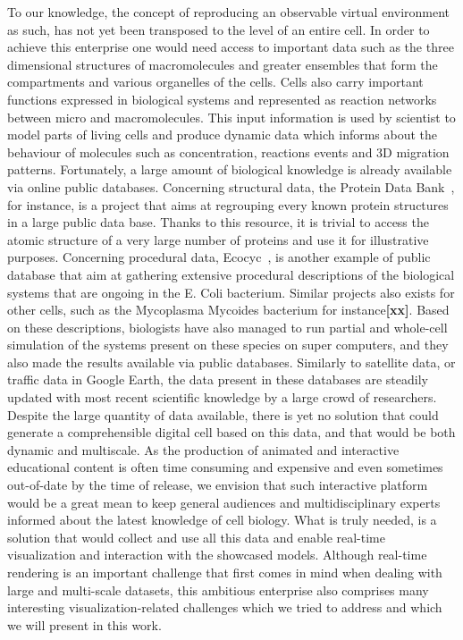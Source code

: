 To our knowledge, the concept of reproducing an observable virtual environment as such, has not yet been transposed to the level of an entire cell.
In order to achieve this enterprise one would need access to important data such as the three dimensional structures of macromolecules and greater ensembles that form the compartments and various organelles of the cells.
Cells also carry important functions expressed in biological systems and represented as reaction networks between micro and macromolecules.
This input information is used by scientist to model parts of living cells and produce dynamic data which informs about the behaviour of molecules such as concentration, reactions events and 3D migration patterns.
Fortunately, a large amount of biological knowledge is already available via online public databases.
Concerning structural data, the Protein Data Bank~\cite{bernstein1977protein}, for instance, is a project that aims at regrouping every known protein structures in a large public data base.
Thanks to this resource, it is trivial to access the atomic structure of a very large number of proteins and use it for illustrative purposes.
Concerning procedural data, Ecocyc~\cite{keseler2005ecocyc}, is another example of public database that aim at gathering extensive procedural descriptions of the biological systems that are ongoing in the E. Coli bacterium.
Similar projects also exists for other cells, such as the Mycoplasma Mycoides bacterium for instance\textbf{[xx]}.
Based on these descriptions, biologists have also managed to run partial and whole-cell simulation of the systems present on these species on super computers, and they also made the results available via public databases\cite{karr2014wholecellsimdb}.
Similarly to satellite data, or traffic data in Google Earth, the data present in these databases are steadily updated with most recent scientific knowledge by a large crowd of researchers.
Despite the large quantity of data available, there is yet no solution that could generate a comprehensible digital cell based on this data, and that would be both dynamic and multiscale.
As the production of animated and interactive educational content is often time consuming and expensive and even sometimes out-of-date by the time of release, we envision that such interactive platform would be a great mean to keep general audiences and multidisciplinary experts informed about the latest knowledge of cell biology.
What is truly needed, is a solution that would collect and use all this data and enable real-time visualization and interaction with the showcased models.
Although real-time rendering is an important challenge that first comes in mind when dealing with large and multi-scale datasets, this ambitious enterprise also comprises many interesting visualization-related challenges which we tried to address and which we will present in this work.

